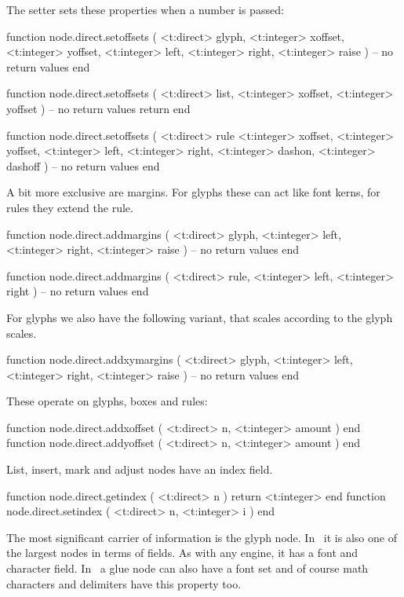 The setter sets these properties when a number is passed:

\starttyping[option=LUA]
function node.direct.setoffsets (
    <t:direct>  glyph,
    <t:integer> xoffset,
    <t:integer> yoffset,
    <t:integer> left,
    <t:integer> right,
    <t:integer> raise
)
    -- no return values
end

function node.direct.setoffsets (
    <t:direct>  list,
    <t:integer> xoffset,
    <t:integer> yoffset
)
    -- no return values
    return
end

function node.direct.setoffsets (
    <t:direct>  rule
    <t:integer> xoffset,
    <t:integer> yoffset,
    <t:integer> left,
    <t:integer> right,
    <t:integer> dashon,
    <t:integer> dashoff
)
    -- no return values
end
\stoptyping

A bit more exclusive are margins. For glyphs these can act like font kerns, for
rules they extend the rule.

\starttyping[option=LUA]
function node.direct.addmargins (
    <t:direct>  glyph,
    <t:integer> left,
    <t:integer> right,
    <t:integer> raise
)
    -- no return values
end

function node.direct.addmargins (
    <t:direct>  rule,
    <t:integer> left,
    <t:integer> right
)
    -- no return values
end
\stoptyping

For glyphs we also have the following variant, that scales according to the glyph
scales.

\starttyping[option=LUA]
function node.direct.addxymargins (
    <t:direct>  glyph,
    <t:integer> left,
    <t:integer> right,
    <t:integer> raise
)
    -- no return values
end
\stoptyping

These operate on glyphs, boxes and rules:

\starttyping[option=LUA]
function node.direct.addxoffset ( <t:direct> n, <t:integer> amount ) end
function node.direct.addyoffset ( <t:direct> n, <t:integer> amount ) end
\stoptyping

List, insert, mark and adjust nodes have an index field.

\starttyping[option=LUA]
function node.direct.getindex ( <t:direct> n ) return <t:integer> end
function node.direct.setindex ( <t:direct> n, <t:integer> i ) end
\stoptyping

\stopsubsection

\startsubsection[title={Fonts and characters}]

The most significant carrier of information is the glyph node. In \LUAMETATEX\ it
is also one of the largest nodes in terms of fields. As with any engine, it has a
font and character field. In \LUAMETATEX\ a glue node can also have a font set
and of course math characters and delimiters have this property too.

